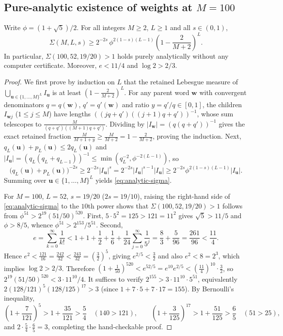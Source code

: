 \documentclass[11pt]{article}
\begin{document}
\subsection{Pure-analytic existence of weights at \texorpdfstring{$M=100$}{M = 100}}

\begin{proposition}[Pure-analytic hand-checkable certificate at $M=100$]\label{prop:analytic-100}
Write $\phi=(1+\sqrt5)/2$. For all integers $M\ge2$, $L\ge1$ and all $s\in(0,1)$,
\begin{equation}\label{eq:analytic-sigma}
\Sigma(M,L,s)\ge 2^{-2s}\,\phi^{2(1-s)(L-1)}\left(1-\frac2{M+2}\right)^L.
\end{equation}
In particular, $\Sigma(100,52,19/20)>1$ holds purely analytically without any computer certificate. Moreover, $e<11/4$ and $\log 2>2/3$.
\end{proposition}

\begin{proof}
We first prove by induction on $L$ that the retained Lebesgue measure of $\bigcup_{\mathbf{u}\in\{1,\dots,M\}^L}I_{\mathbf{u}}$ is at least $(1-\frac2{M+2})^L$. For any parent word $\mathbf{w}$ with convergent denominators $q=q(\mathbf{w})$, $q'=q'(\mathbf{w})$ and ratio $y=q'/q\in[0,1]$, the children $I_{\mathbf{w}j}$ ($1\le j\le M$) have lengths $((jq+q')((j+1)q+q'))^{-1}$, whose sum telescopes to $\frac{M}{(q+q')((M+1)q+q')}$. Dividing by $|I_{\mathbf{w}}|=(q(q+q'))^{-1}$ gives the exact retained fraction $\frac{M}{M+1+y}\ge\frac{M}{M+2}=1-\frac2{M+2}$, proving the induction. Next, $q_L(\mathbf{u})+p_L(\mathbf{u})\le 2q_L(\mathbf{u})$ and $|I_{\mathbf{u}}|=(q_L(q_L+q_{L-1}))^{-1}\le\min(q_L^{-2},\phi^{-2(L-1)})$, so
\[
\bigl(q_L(\mathbf{u})+p_L(\mathbf{u})\bigr)^{-2s}\ge 2^{-2s}|I_{\mathbf{u}}|^s=2^{-2s}|I_{\mathbf{u}}|^{s-1}|I_{\mathbf{u}}|\ge 2^{-2s}\phi^{2(1-s)(L-1)}|I_{\mathbf{u}}|.
\]
Summing over $\mathbf{u}\in\{1,\dots,M\}^L$ yields \eqref{eq:analytic-sigma}.

For $M=100$, $L=52$, $s=19/20$ ($2s=19/10$), raising the right-hand side of \eqref{eq:analytic-sigma} to the $10$th power shows that $\Sigma(100,52,19/20)>1$ follows from $\phi^{51}>2^{19}(51/50)^{520}$. First, $5\cdot 5^2=125>121=11^2$ gives $\sqrt5>11/5$ and $\phi>8/5$, whence $\phi^{51}>2^{153}/5^{51}$. Second,
\[
e=\sum_{k=0}^\infty\frac1{k!}<1+1+\frac12+\frac16+\frac1{24}\sum_{j=0}^\infty\frac1{5^j}=\frac83+\frac5{96}=\frac{261}{96}<\frac{11}4.
\]
Hence $e^2<\frac{121}{16}=\frac{242}{32}<\frac{243}{32}=(\frac32)^5$, giving $e^{2/5}<\frac32$ and also $e^2<8=2^3$, which implies $\log 2>2/3$. Therefore $(1+\frac1{50})^{520}<e^{52/5}=e^{10}e^{2/5}<(\frac{11}4)^{10}\cdot\frac32$, so $2^{19}(51/50)^{520}<3\cdot 11^{10}/4$. It suffices to verify $2^{155}>3\cdot 11^{10}\cdot 5^{51}$, equivalently $2(128/121)^5(128/125)^{17}>3$ (since $1+7\cdot 5+7\cdot 17=155$). By Bernoulli's inequality,
\[
\left(1+\frac7{121}\right)^5>1+\frac{35}{121}>\frac54\quad(140>121),\qquad
\left(1+\frac3{125}\right)^{17}>1+\frac{51}{125}>\frac65\quad(51>25),
\]
and $2\cdot\frac54\cdot\frac65=3$, completing the hand-checkable proof.
\end{proof}
\end{document}
